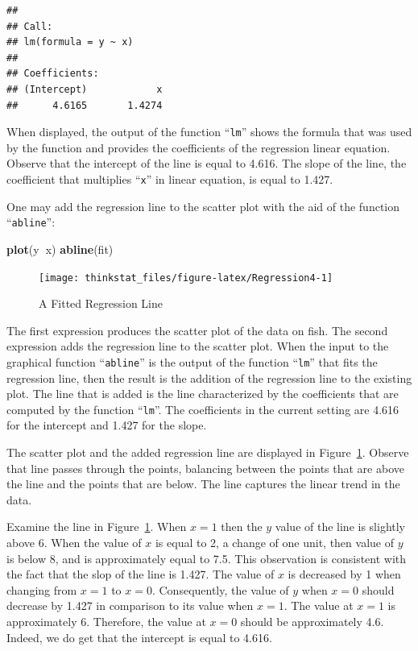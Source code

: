 \documentclass[]{krantz}
\makeatletter
\newenvironment{Shaded}{\begin{snugshade}}{\end{snugshade}}
\newcommand{\KeywordTok}[1]{\textcolor[rgb]{0.13,0.29,0.53}{\textbf{#1}}}
\newcommand{\OperatorTok}[1]{\textcolor[rgb]{0.81,0.36,0.00}{\textbf{#1}}}
\newcommand{\NormalTok}[1]{#1}
\newenvironment{kframe}{%
\medskip{}
\setlength{\fboxsep}{.8em}
 \def\at@end@of@kframe{}%
 \ifinner\ifhmode%
  \def\at@end@of@kframe{\end{minipage}}%
  \begin{minipage}{\columnwidth}%
 \fi\fi%
 \def\FrameCommand##1{\hskip\@totalleftmargin \hskip-\fboxsep
 \colorbox{shadecolor}{##1}\hskip-\fboxsep
     \hskip-\linewidth \hskip-\@totalleftmargin \hskip\columnwidth}%
 \MakeFramed {\advance\hsize-\width
   \@totalleftmargin\z@ \linewidth\hsize
   \@setminipage}}%
 {\par\unskip\endMakeFramed%
 \at@end@of@kframe}
\renewenvironment{Shaded}{\begin{kframe}}{\end{kframe}}
\theoremstyle{definition}
\theoremstyle{definition}
\theoremstyle{definition}
\theoremstyle{remark}
\makeatother
\begin{document}
\begin{verbatim}
## 
## Call:
## lm(formula = y ~ x)
## 
## Coefficients:
## (Intercept)            x  
##      4.6165       1.4274
\end{verbatim}

When displayed, the output of the function ``\texttt{lm}'' shows the
formula that was used by the function and provides the coefficients of
the regression linear equation. Observe that the intercept of the line
is equal to 4.616. The slope of the line, the coefficient that
multiplies ``\texttt{x}'' in linear equation, is equal to 1.427.

One may add the regression line to the scatter plot with the aid of the
function ``\texttt{abline}'':

\begin{Shaded}
\begin{Highlighting}[]
\KeywordTok{plot}\NormalTok{(y}\OperatorTok{~}\NormalTok{x)}
\KeywordTok{abline}\NormalTok{(fit)}
\end{Highlighting}
\end{Shaded}

\begin{figure}

{\centering \texttt{[image: thinkstat\_files/figure-latex/Regression4-1]} 

}

\caption{A Fitted Regression Line}\label{fig:Regression4}
\end{figure}

The first expression produces the scatter plot of the data on fish. The
second expression adds the regression line to the scatter plot. When the
input to the graphical function ``\texttt{abline}'' is the output of the
function ``\texttt{lm}'' that fits the regression line, then the result
is the addition of the regression line to the existing plot. The line
that is added is the line characterized by the coefficients that are
computed by the function ``\texttt{lm}''. The coefficients in the
current setting are 4.616 for the intercept and 1.427 for the slope.

The scatter plot and the added regression line are displayed in
Figure~\ref{fig:Regression4}. Observe that line passes through the
points, balancing between the points that are above the line and the
points that are below. The line captures the linear trend in the data.

Examine the line in Figure~\ref{fig:Regression4}. When \(x=1\) then the
\(y\) value of the line is slightly above 6. When the value of \(x\) is
equal to 2, a change of one unit, then value of \(y\) is below 8, and is
approximately equal to 7.5. This observation is consistent with the fact
that the slop of the line is 1.427. The value of \(x\) is decreased by 1
when changing from \(x=1\) to \(x=0\). Consequently, the value of \(y\)
when \(x=0\) should decrease by 1.427 in comparison to its value when
\(x=1\). The value at \(x=1\) is approximately 6. Therefore, the value
at \(x=0\) should be approximately 4.6. Indeed, we do get that the
intercept is equal to 4.616.
\end{document}

